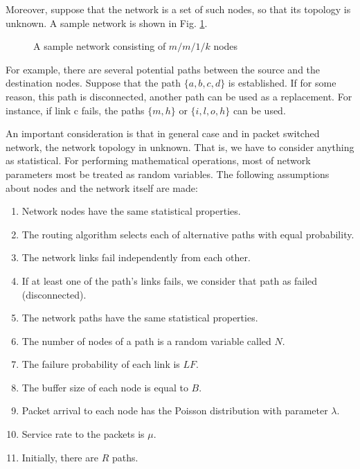 \documentclass[onecolumn,conference]{IEEEtran}
\begin{document}
    Moreover, suppose that the network is a set of such nodes, so that its topology is unknown. A sample network is shown in Fig. \ref{fig:2}.

    \begin{figure}[htbp]
        \centering
        \caption{A sample network consisting of $m/m/1/k$ nodes}
        \label{fig:2}
    \end{figure}

    For example, there are several potential paths between the source and the destination nodes. Suppose that the path $\{a, b, c, d\}$ is established. If for some reason, this path is disconnected, another path can be used as a replacement. For instance, if link c fails, the paths $\{m, h\}$ or $\{i, l, o, h\}$ can be used.

    An important consideration is that in general case and in packet switched network, the network topology in unknown. That is, we have to consider anything as statistical. For performing mathematical operations, most of network parameters most be treated as random variables. The following assumptions about nodes and the network itself are made:

    \begin{enumerate}
        \item Network nodes have the same statistical properties.
        \item The routing algorithm selects each of alternative paths with equal probability.
        \item The network links fail independently from each other.
        \item If at least one of the path's links fails, we consider that path as failed (disconnected).
        \item The network paths have the same statistical properties.
        \item The number of nodes of a path is a random variable called $N$.
        \item The failure probability of each link is $LF$.
        \item The buffer size of each node is equal to $B$.
        \item Packet arrival to each node has the Poisson distribution with parameter $\lambda$.
        \item Service rate to the packets is $\mu$.
        \item Initially, there are $R$ paths.
    \end{enumerate}
\end{document}
